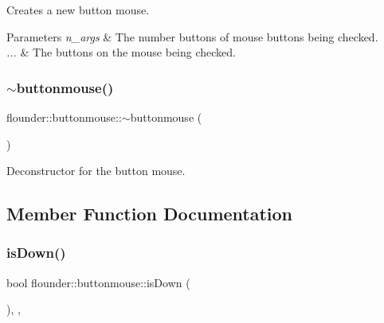 Creates a new button mouse. 


\begin{DoxyParams}{Parameters}
{\em n\+\_\+args} & The number buttons of mouse buttons being checked. \\
\hline
{\em ...} & The buttons on the mouse being checked. \\
\hline
\end{DoxyParams}
\mbox{\label{classflounder_1_1buttonmouse_aa967f7f977040b0f4a58dc10d4414e75}} 
\subsubsection{\texorpdfstring{$\sim$buttonmouse()}{~buttonmouse()}}
{\footnotesize\ttfamily flounder\+::buttonmouse\+::$\sim$buttonmouse (\begin{DoxyParamCaption}{ }\end{DoxyParamCaption})\hspace{0.3cm}{\ttfamily [inline]}}



Deconstructor for the button mouse. 



\subsection{Member Function Documentation}
\mbox{\label{classflounder_1_1buttonmouse_ab4d7ecd54f144f03886b5ef467666be1}} 
\subsubsection{\texorpdfstring{is\+Down()}{isDown()}}
{\footnotesize\ttfamily bool flounder\+::buttonmouse\+::is\+Down (\begin{DoxyParamCaption}{ }\end{DoxyParamCaption})\hspace{0.3cm}{\ttfamily [inline]}, {\ttfamily [override]}, {\ttfamily [virtual]}}



